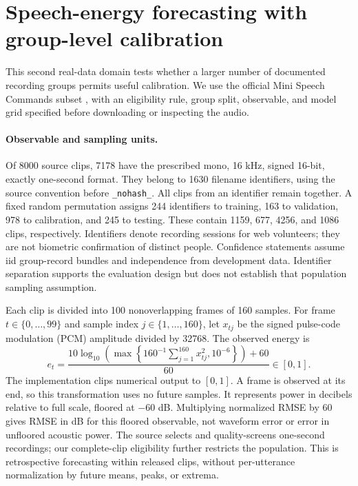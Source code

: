 \section{Speech-energy forecasting with group-level calibration}
\label{sec:speech}

This second real-data domain tests whether a larger number of documented
recording groups permits useful calibration. We use the official Mini Speech
Commands subset \citep{warden2018speech,tensorflow2026mini}, with an eligibility
rule, group split, observable, and model grid specified
before downloading or inspecting the audio.

\paragraph{Observable and sampling units.}
Of 8000 source clips, 7178 have the prescribed mono, 16 kHz, signed 16-bit,
exactly one-second format. They belong to 1630 filename identifiers, using the
source convention before \texttt{\_nohash\_}. All clips from an identifier
remain together. A fixed random permutation assigns 244 identifiers to
training, 163 to validation, 978 to calibration, and 245 to testing. These
contain 1159, 677, 4256, and 1086 clips, respectively. Identifiers denote
recording sessions for web volunteers; they are not biometric confirmation
of distinct people. Confidence statements assume iid group-record bundles
and independence from development data. Identifier separation supports the
evaluation design but does not establish that population sampling assumption.

Each clip is divided into 100 nonoverlapping frames of 160 samples. For frame
$t\in\{0,\ldots,99\}$ and sample index $j\in\{1,\ldots,160\}$,
let $x_{tj}$ be the signed pulse-code modulation (PCM) amplitude divided by
32768. The observed energy is
\[
 e_t=\frac{10\log_{10}\!\left(\max\left\{160^{-1}\sum_{j=1}^{160}
 x_{tj}^2,10^{-6}\right\}\right)+60}{60}\in[0,1].
\]
The implementation clips numerical output to $[0,1]$. A frame is observed at
its end, so this transformation uses no future samples. It represents power
in decibels relative to full scale, floored at $-60$ dB. Multiplying normalized
RMSE by 60 gives RMSE in dB for this floored observable, not waveform error
or error in unfloored acoustic power. The source selects and quality-screens
one-second recordings; our complete-clip eligibility further restricts the
population. This is retrospective forecasting within released clips, without
per-utterance normalization by future means, peaks, or extrema.

